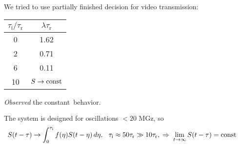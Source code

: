 
\begin{minipage}{0.71\textwidth}
      We tried to use partially finished decision for video transmission:
    \begin{center}
    \end{center}
\end{minipage}
\hfill
\begin{minipage}{0.25\textwidth}
    \begin{tabular}{c|c}
     $\tau_\text{i} / \tau_{\text{r}}$ & $\lambda \tau_{\text{r}}$ \\
     \hline
     0 & 1.62 \\ 
     2 & 0.71 \\
     6 & 0.11 \\
     10 & $S \to \text{const}$ \\
    \end{tabular}

    \phantom{42}

    \textit{Observed} the constant~{behavior}.
\end{minipage}



The system is designed for oscillations $< 20$ MGz, so
\vspace{-2mm}
\begin{equation*}
    \hspace{-5mm}
    S(t - \tau) \to \int_{0}^{\tau_\text{i}} f(\eta) S(t-\eta) \d\eta,
    \hspace{2.5 mm} 
    \tau_\text{i} \approx 50 \tau_{\text{r}} \gg 10 \tau_{\text{r}},
    \hspace{0.1cm} \Rightarrow \hspace{0.1cm}
    \lim_{t \to \infty} S(t-\tau) = \const
\end{equation*}



% 

%